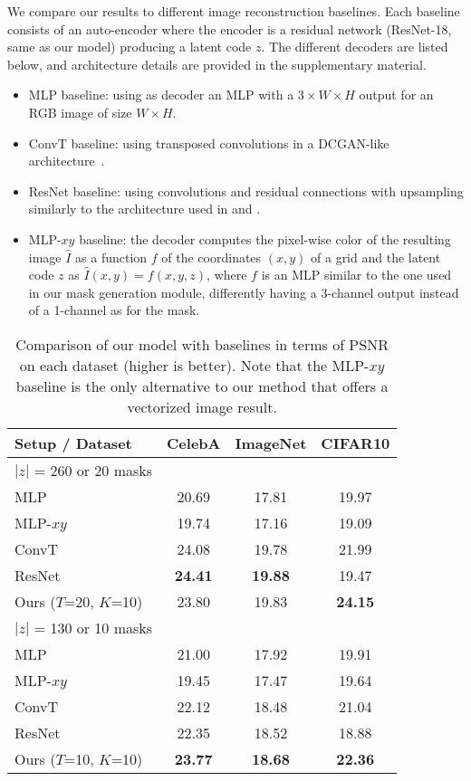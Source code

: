 \documentclass[10pt,twocolumn,letterpaper]{article}
\begin{document}
We compare our results to different image reconstruction baselines. Each baseline consists of an auto-encoder where the encoder is a residual network (ResNet-18, same as our model) producing a latent code $z$. The different decoders are listed below, and architecture details are provided in the supplementary material.
\begin{itemize}
    \item {MLP baseline:} using as decoder an MLP with a $3\times W \times H$ output for an RGB image of size $W\times H$.
    \item {ConvT baseline:} using transposed convolutions in a DCGAN-like architecture~\cite{radford2015unsupervised}.
    \item {ResNet baseline:} using convolutions and residual connections with upsampling similarly to the architecture used in \cite{miyato2018spectral} and \cite{kurach2018gan}.
   \item {MLP-$xy$ baseline:} the decoder computes the pixel-wise color of the resulting image $\hat{I}$ as a function $f$ of the coordinates $(x,y)$ of a grid and the latent code $z$ as $\hat{I}(x,y) = f(x,y,z)$, where $f$ is an MLP similar to the one used in our mask generation module, differently having a 3-channel output instead of a 1-channel as for the mask. 
\end{itemize}


\begin{table}[!h]
\centering
\caption{Comparison of our model with baselines in terms of PSNR on each dataset (higher is better). Note that the MLP-$xy$ baseline is the only alternative to our method that offers a vectorized image result.}
\label{table:rec_losses_our_vs_baselines}
\begin{tabular}{lccc}

\hline
Setup / Dataset   & CelebA & ImageNet & CIFAR10 \\
\hline
$|z|$ = 260 or 20 masks \\
\hline
MLP  & 20.69 &  17.81 & 19.97 \\
MLP-$xy$  & 19.74 & 17.16  & 19.09 \\
ConvT  & 24.08 &  19.78 & 21.99\\
ResNet  & \textbf{24.41} &  \textbf{19.88} & 19.47\\
Ours ($T$=20, $K$=10)  & 23.80 & 19.83  & \textbf{24.15} \\
\hline
$|z|$ = 130 or 10 masks  \\
\hline
MLP  & 21.00 &  17.92 &  19.91 \\
MLP-$xy$  & 19.45 & 17.47  & 19.64 \\
ConvT  & 22.12 &  18.48 & 21.04\\
ResNet  & 22.35 &  18.52 & 18.88\\
Ours ($T$=10, $K$=10) & \textbf{23.77} & \textbf{18.68} & \textbf{22.36} \\
\hline
\end{tabular}
\end{table}
\end{document}
